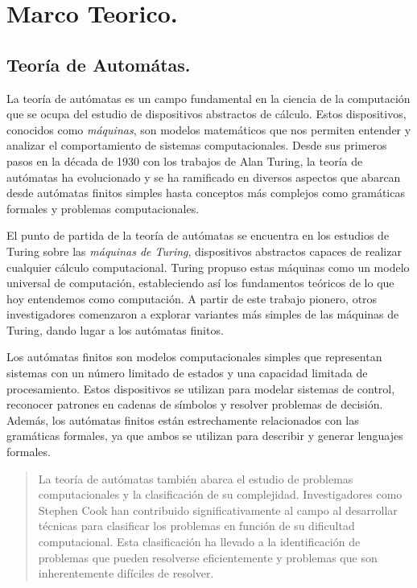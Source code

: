 \documentclass{article}
\begin{document}
\section{Marco Teorico.}
    \subsection{Teoría de Automátas.}
        La teoría de autómatas es un campo fundamental en la ciencia de la computación que se ocupa del estudio de dispositivos
        abstractos de cálculo. Estos dispositivos, conocidos como \textit{máquinas}, son modelos matemáticos que nos permiten entender y
        analizar el comportamiento de sistemas computacionales. Desde sus primeros pasos en la década de 1930 con los trabajos de
        Alan Turing, la teoría de autómatas ha evolucionado y se ha ramificado en diversos aspectos que abarcan desde autómatas finitos
        simples hasta conceptos más complejos como gramáticas formales y problemas computacionales.

        El punto de partida de la teoría de autómatas se encuentra en los estudios de Turing sobre las \textit{máquinas de Turing},
        dispositivos abstractos capaces de realizar cualquier cálculo computacional. Turing propuso estas máquinas como un modelo universal
        de computación, estableciendo así los fundamentos teóricos de lo que hoy entendemos como computación. A partir de este trabajo pionero,
        otros investigadores comenzaron a explorar variantes más simples de las máquinas de Turing, dando lugar a los autómatas finitos.

        Los autómatas finitos son modelos computacionales simples que representan sistemas con un número limitado de estados y una capacidad
        limitada de procesamiento. Estos dispositivos se utilizan para modelar sistemas de control, reconocer patrones en cadenas de
        símbolos y resolver problemas de decisión. Además, los autómatas finitos están estrechamente relacionados con las gramáticas
        formales, ya que ambos se utilizan para describir y generar lenguajes formales.

        \begin{quote}
            La teoría de autómatas también abarca el estudio de problemas computacionales y la clasificación de su complejidad. Investigadores
            como Stephen Cook han contribuido significativamente al campo al desarrollar técnicas para clasificar los problemas en función de
            su dificultad computacional. Esta clasificación ha llevado a la identificación de problemas que pueden resolverse eficientemente y
            problemas que son inherentemente difíciles de resolver.\cite{hopcroft2007introduccion}
        \end{quote}
\end{document}
